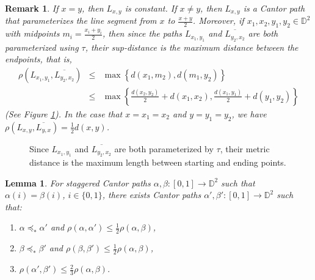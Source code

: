 \documentclass[10pt,a4paper]{amsart}
\newtheorem{lemma}{Lemma}
\newtheorem{remark}{Remark}
\newcommand{\bbd}{\mathbb{D}}
\newcommand{\ord}{\preceq_{\ast}}
\newcommand{\ov}{\overline}
\newcommand{\ui}{[0,1]}
\begin{document}
\begin{remark}\label{linearpathremark}
If $x=y$, then $L_{x,y}$ is constant. If $x\neq y$, then $L_{x,y}$ is a Cantor path that parameterizes the line segment from $x$ to $\frac{x+y}{2}$. Moreover, if $x_1,x_2,y_1,y_2\in \bbd^2$ with midpoints $m_i=\frac{x_i+y_i}{2}$, then since the paths $L_{x_1,y_1}$ and $\ov{L_{y_2,x_2}}$ are both parameterized using $\tau$, their sup-distance is the maximum distance between the endpoints, that is,
\begin{eqnarray*}
\rho(L_{x_1,y_1},\ov{L_{y_2,x_2}}) &\leq& \max\left\{d(x_1,m_2),d(m_1,y_2)\right\}\\
&\leq & \max\left\{\frac{d(x_2,y_2)}{2}+d(x_1,x_2),\frac{d(x_1,y_1)}{2}+d(y_1,y_2)\right\}
\end{eqnarray*}
(See Figure \ref{fig1}). In the case that $x=x_1=x_2$ and $y=y_1=y_2$, we have $\rho(L_{x,y},\ov{L_{y,x}})=\frac{1}{2}d(x,y)$.
\end{remark}

\begin{figure}[H]
\centering 
\caption{\label{fig1}Since $L_{x_1,y_1}$ and $\ov{L_{y_2,x_2}}$ are both parameterized by $\tau$, their metric distance is the maximum length between starting and ending points.}
\end{figure}

\begin{lemma}\label{fabelsconstruction}
For staggered Cantor paths $\alpha,\beta:\ui\to \bbd^2$ such that $\alpha(i)=\beta(i)$, $i\in\{0,1\}$, there exists Cantor paths $\alpha ',\beta ':\ui\to\bbd^2$ such that:
\begin{enumerate}
\item $\alpha\ord \alpha '$ and $\rho(\alpha,\alpha ')\leq \frac{1}{2}\rho(\alpha,\beta)$,
\item $\beta\ord \beta '$ and $\rho(\beta,\beta ')\leq \frac{1}{2}\rho(\alpha,\beta)$,
\item $\rho(\alpha ',\beta ')\leq  \frac{2}{3}\rho(\alpha,\beta)$.
\end{enumerate}
\end{lemma}
\end{document}
